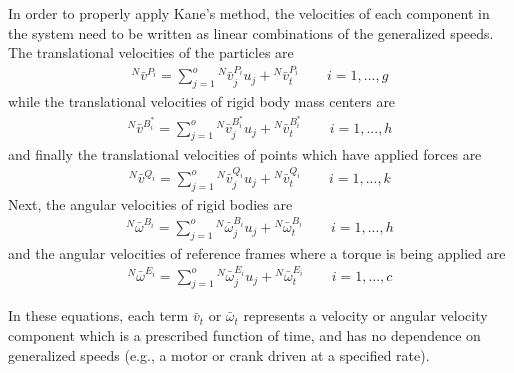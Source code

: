 \documentclass[smallcondensed,final]{svjour3}                     %
\begin{document}
In order to properly apply Kane's method, the velocities of each component in
the system need to be written as linear combinations of the generalized speeds.
The translational velocities of the particles are
\begin{align}
\label{eq:particle_translational}
{^N}\bar{v}^{P_i} = \sum^o_{j=1} {^N}\bar{v}^{P_i}_{j} u_j + {^N}\bar{v}^{P_i}_t
\quad \quad i=1,...,g
\end{align}
while the translational velocities of rigid body mass centers are
\begin{align}
\label{eq:rb_translational}
{^N}\bar{v}^{B_i^*} = \sum_{j=1}^o {^N}\bar{v}^{B_i^*}_{j} u_j +
{^N}\bar{v}^{B_i^*}_t \quad \quad i=1,...,h
\end{align}
and finally the translational velocities of points which have applied forces are
\begin{align}
\label{eq:points_translational}
{^N}\bar{v}^{Q_i} = \sum_{j=1}^o {^N}\bar{v}^{Q_i}_{j} u_j + {^N}\bar{v}^{Q_i}_t
\quad \quad i=1,...,k
\end{align}
Next, the angular velocities of rigid bodies are
\begin{align}
\label{eq:rb_rotational_bodies}
{^N}\bar{\omega}^{B_i} = \sum_{j=1}^o {^N}\bar{\omega}^{B_i}_{j} u_j +
{^N}\bar{\omega}^{B_i}_t \quad \quad i=1,...,h
\end{align}
and the angular velocities of reference frames where a torque is being applied
are
\begin{align}
\label{eq:rb_rotational_frames}
{^N}\bar{\omega}^{E_i} = \sum_{j=1}^o {^N}\bar{\omega}^{E_i}_{j} u_j +
{^N}\bar{\omega}^{E_i}_t \quad \quad i=1,...,c
\end{align}

In these equations, each term $\bar{v}_t$ or $\bar{\omega}_t$ represents a
velocity or angular velocity component which is a prescribed function of time,
and has no dependence on generalized speeds (e.g., a motor or crank driven at a
specified rate).
\end{document}
